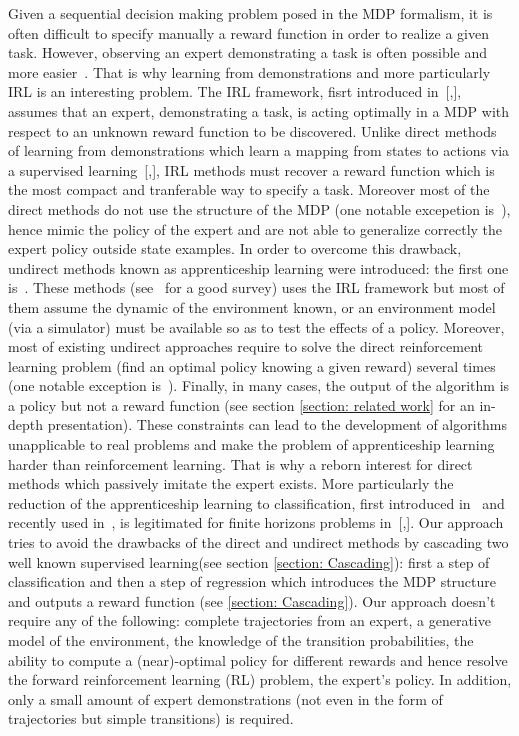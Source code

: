 \documentclass{llncs}
\newcommand{\0}{\mathbf{0}}
\newcommand{\1}{\mathbf{1}}
\begin{document}
Given a sequential decision making problem posed in the MDP formalism, it is often difficult to specify manually a reward function in order to realize a given task. However, observing an expert demonstrating a task is often possible and more easier~\cite{ng2000algorithms}. That is why learning from demonstrations and more particularly IRL is an interesting problem. The IRL framework, fisrt introduced in~[\cite{russell1998learning},\cite{ng2000algorithms}], assumes that an expert, demonstrating a task, is acting optimally in a MDP with respect to an unknown reward function to be discovered. Unlike direct methods of learning from demonstrations which learn a mapping from states to actions via a supervised learning~[\cite{atkeson1997robot},\cite{pomerleau1989alvinn}], IRL methods must recover a reward function which is the most compact and tranferable way to specify a task. Moreover most of the direct methods do not use the structure of the MDP (one notable excepetion is~\cite{melo2010learning}), hence mimic the policy of the expert and are not able to generalize correctly the expert policy outside state examples. In order to overcome this drawback, undirect methods known as apprenticeship learning were introduced: the first one is~\cite{ng2004feature}. These methods (see~\cite{neu2009training} for a good survey) uses the IRL framework but most of them assume the dynamic of the environment known, or an environment model (via a simulator) must be available so as to test the effects of a policy. Moreover, most of existing undirect approaches require to solve the direct reinforcement learning problem (find an optimal policy knowing a given reward) several times (one notable exception is~\cite{boularias2011relative}). Finally, in many cases, the output of the algorithm is a policy but not a reward function (see section \ref{section: related work} for an in-depth presentation). These constraints can lead to the development of algorithms unapplicable to real problems and make the problem of apprenticeship learning harder than reinforcement learning. That is why a reborn interest for direct methods which passively imitate the expert exists. More particularly the reduction of the apprenticeship learning to classification, first introduced in~\cite{zadrozny2003cost} and recently used in~\cite{melo2010learning}, is legitimated for finite horizons problems in~[\cite{syed2010reduction},\cite{ross2010efficient}]. Our approach tries to avoid the drawbacks of the direct and undirect methods by cascading two well known supervised learning(see section \ref{section: Cascading}): first a step of classification and then a step of regression which introduces the MDP structure and  outputs a reward function (see \ref{section: Cascading}). Our approach doesn't require any of the following: complete trajectories from an expert, a generative model of the environment, the knowledge of the transition probabilities, the ability to compute a (near)-optimal policy for different rewards and hence resolve the forward reinforcement learning (RL) problem, the expert's policy. In addition, only a small amount of expert demonstrations (not even in the form of trajectories but simple transitions) is required.\\
\end{document}
